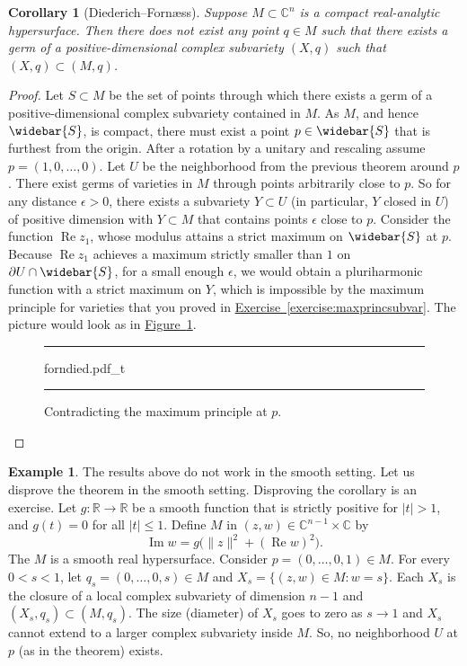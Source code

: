 \documentclass[12pt,openany]{book}
\renewcommand{\Re}{\operatorname{Re}}
\renewcommand{\Im}{\operatorname{Im}}
\newcommand{\sabs}[1]{\lvert {#1} \rvert}
\newcommand{\snorm}[1]{\lVert {#1} \rVert}
\newcommand{\C}{{\mathbb{C}}}
\newcommand{\R}{{\mathbb{R}}}
\theoremstyle{plain}
\newtheorem{cor}[thm]{Corollary}
\theoremstyle{remark}
\theoremstyle{definition}
\newenvironment{myfig}{%
\begin{figure}[h!t]
\noindent\rule{\textwidth}{0.5pt}\vspace{12pt}\par\centering}%
{\par\noindent\rule{\textwidth}{0.5pt}
\end{figure}}
\theoremstyle{exercise}
\theoremstyle{example}
\newtheorem{example}[thm]{Example}
\newcommand{\figureref}[1]{\hyperref[#1]{Figure~\ref*{#1}}}
\newcommand{\exerciseref}[1]{\hyperref[#1]{Exercise~\ref*{#1}}}
\begin{document}
\begin{cor}[Diederich--Forn\ae ss]
Suppose $M \subset \C^n$ is a compact real-analytic hypersurface.
Then there does not exist any point $q \in M$ such that
there exists a germ of a positive-dimensional complex subvariety
$(X,q)$ such that $(X,q) \subset (M,q)$.
\end{cor}

\begin{proof}
Let $S \subset M$ be the set of points through which there exists
a germ of a positive-dimensional complex subvariety contained in $M$.
As $M$, and hence $\widebar{S}$, is compact,
there must exist a point $p \in \widebar{S}$
that is furthest from
the origin.  After a rotation by a unitary and rescaling assume
$p=(1,0,\ldots,0)$.  Let $U$ be the neighborhood from the previous
theorem around $p$.  There exist germs of varieties in $M$ through points
arbitrarily close to $p$.  So for any distance $\epsilon > 0$,
there exists a subvariety $Y \subset U$ (in particular, $Y$ closed in $U$)
of positive dimension with $Y \subset M$ that contains points
$\epsilon$ close to $p$.  Consider the function $\Re z_1$, whose modulus attains a
strict maximum on $\widebar{S}$ at $p$.  Because $\Re z_1$ achieves a maximum
strictly smaller than $1$ on $\partial U \cap \widebar{S}$, for a small enough $\epsilon$,
we would obtain a pluriharmonic function with a strict
maximum on $Y$, which is impossible by the maximum principle for
varieties that you proved in \exerciseref{exercise:maxprincsubvar}.
The picture would look as in \figureref{fig:forndied}.
\begin{myfig}
\medskip
{forndied.pdf_t}
\caption{Contradicting the maximum principle at $p$.\label{fig:forndied}}
\end{myfig}
\end{proof}

\begin{example}
The results above do not work
in the smooth setting.  Let us disprove the theorem in the smooth
setting.  Disproving the corollary is an exercise.
Let $g \colon \R \to \R$ be a smooth function that is
strictly positive for $\sabs{t} > 1$, and $g(t) = 0$ for all $\sabs{t} \leq 1$.
Define $M$ in $(z,w) \in \C^{n-1} \times \C$ by
\begin{equation*}
\Im w = g\bigl(\snorm{z}^2 + (\Re w)^2\bigr) .
\end{equation*}
The $M$ is a smooth real hypersurface.
Consider $p = (0,\ldots,0,1) \in M$.  For every $0 < s < 1$, let
$q_s = (0,\ldots,0,s) \in M$ and $X_s = \bigl\{ (z,w) \in M :
w = s \bigr\}$.  Each $X_s$ is the closure of a local complex subvariety of dimension $n-1$
and $(X_s,q_s) \subset (M,q_s)$.  The size (diameter) of $X_s$ goes to
zero as $s \to 1$ and $X_s$ cannot extend to a
larger complex subvariety inside $M$.  So, no neighborhood $U$ at
$p$ (as in the theorem) exists.
\end{example}
\end{document}
